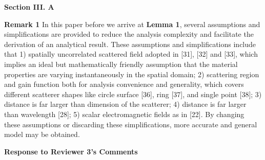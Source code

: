 \documentclass[a4paper,12pt]{article}
\begin{document}
{}

\begin{framed}
	{\bf Section III. A}

    {\color{red}
    {\bf Remark 1}
    \quad In this paper before we arrive at {\bf Lemma 1}, several assumptions and simplifications are provided to reduce the analysis complexity and facilitate the derivation of an analytical result. These assumptions and simplifications include that 1) spatially uncorrelated scattered field adopted in [31], [32] and [33], which implies an ideal but mathematically friendly assumption that the material properties are varying instantaneously in the spatial domain; 2) scattering region and gain function both for analysis convenience and generality, which covers different scatterer shapes like circle surface [36], ring [37], and single point [38]; 3) distance is far larger than dimension of the scatterer; 4) distance is far larger than wavelength [28]; 5) scalar electromagnetic fields as in [22]. By changing these assumptions or discarding these simplifications, more accurate and general model may be obtained. 
    }
\end{framed}
 

{}

\clearpage 



\begin{center}
    {\Large\bf Response to Reviewer 3's Comments}
\end{center}
\end{document}
